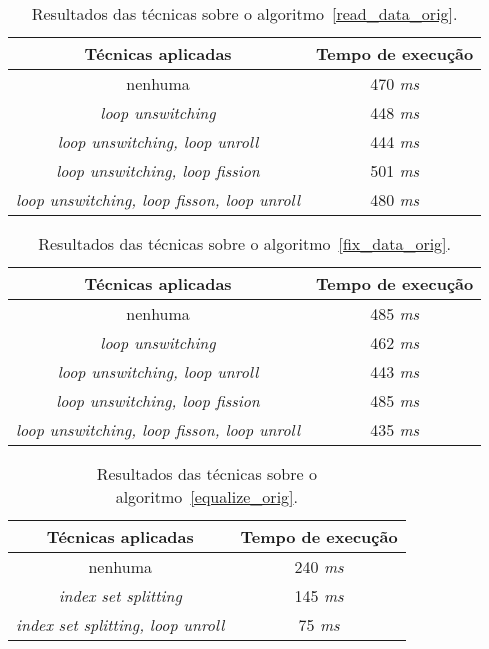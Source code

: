 \documentclass[12pt]{article}
\begin{document}
\begin{table}[H]
  \caption{Resultados das técnicas sobre o algoritmo~\ref{read_data_orig}.}
  \label{tabela_read_data}
\begin{center}
  \begin{tabular}{|c|c|}
    \hline
    Técnicas aplicadas & Tempo de execução\\
    \hline
    nenhuma & 470 \textit{ms} \\
    \hline
    \textit{loop unswitching} & 448 \textit{ms} \\
    \hline
    \textit{loop unswitching, loop unroll} & 444 \textit{ms} \\
    \hline
    \textit{loop unswitching, loop fission} & 501 \textit{ms} \\
    \hline
    \textit{loop unswitching, loop fisson, loop unroll} &  480 \textit{ms} \\
    \hline
  \end{tabular}
\end{center}
\end{table}


\begin{table}[H]
  \caption{Resultados das técnicas sobre o algoritmo~\ref{fix_data_orig}.}
  \label{tabela_fix_data}
\begin{center}
  \begin{tabular}{|c|c|}
    \hline
    Técnicas aplicadas & Tempo de execução\\
    \hline
    nenhuma & 485 \textit{ms} \\
    \hline
    \textit{loop unswitching} & 462 \textit{ms} \\
    \hline
    \textit{loop unswitching, loop unroll} & 443 \textit{ms} \\
    \hline
    \textit{loop unswitching, loop fission} & 485 \textit{ms} \\
    \hline
    \textit{loop unswitching, loop fisson, loop unroll} & 435 \textit{ms} \\
    \hline
  \end{tabular}
\end{center}
\end{table}

\begin{table}[H]
  \caption{Resultados das técnicas sobre o algoritmo~\ref{equalize_orig}.}
  \label{tabela_equalize}
\begin{center}
  \begin{tabular}{|c|c|}
    \hline
    Técnicas aplicadas & Tempo de execução\\
    \hline
    nenhuma & 240 \textit{ms} \\
    \hline
    \textit{index set splitting} & 145 \textit{ms} \\
    \hline
    \textit{index set splitting, loop unroll} & 75 \textit{ms} \\
    \hline
  \end{tabular}
\end{center}
\end{table}
\end{document}
